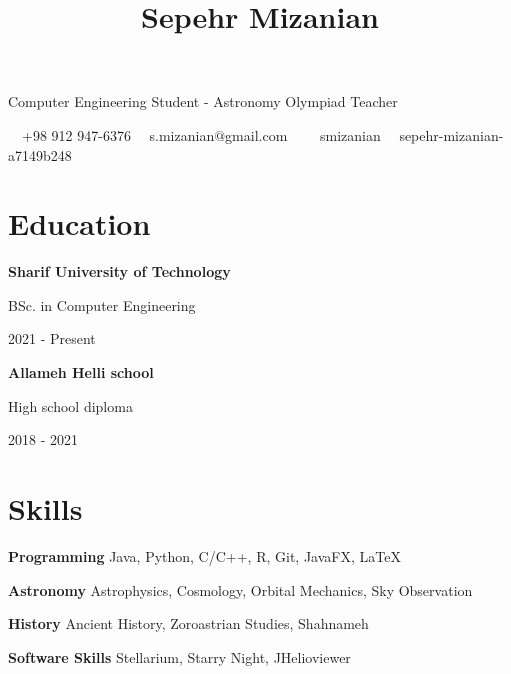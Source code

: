 \documentclass{article}
\begin{document}
\begin{center}
\title*{\textbf{\fontsize{60pt}{40pt}\selectfont \textcolor{BrickRed}{Sepehr Mizanian}}} 

\vspace{2mm}

Computer Engineering Student - Astronomy Olympiad Teacher

\faMobile \ \faWhatsapp \ +98 912 947-6376 \ \faEnvelope\ s.mizanian$@$gmail.com \ \faGithubSquare\ \faInstagram \ \faTwitter \ smizanian \ \faLinkedinSquare \ sepehr-mizanian-a7149b248
\end{center}

\section*{\textcolor{BrickRed}{Edu}cation \noindent\hrulefill} 

\textbf{Sharif University of Technology}

\hspace{5mm}
BSc. in Computer Engineering 

\hspace{5mm}
2021 - Present

\vspace{5mm}

\textbf{Allameh Helli school}

\hspace{5mm}
High school diploma 

\hspace{5mm}
2018 - 2021


\section*{\textcolor{BrickRed}{Ski}lls  \noindent\hrulefill}

\faCode \hspace{1mm} \textbf{Programming} \hfill Java, Python, C/C++, R, Git, JavaFX, LaTeX

\faStar \hspace{1mm} \textbf{Astronomy} \hfill Astrophysics, Cosmology, Orbital Mechanics, Sky Observation

\faBank \hspace{1mm} \textbf{History} \hfill Ancient History, Zoroastrian Studies, Shahnameh

\faWrench \hspace{1mm} \textbf{Software Skills} \hfill Stellarium, Starry Night, JHelioviewer
\end{document}
